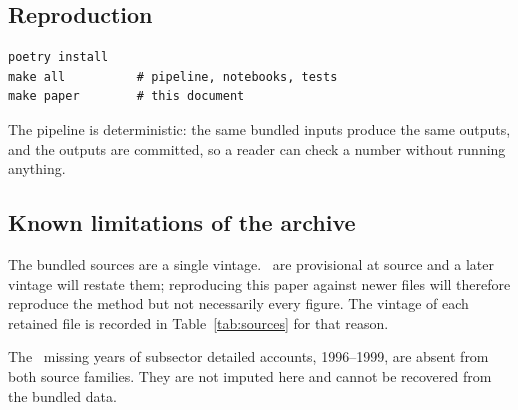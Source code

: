 \subsection{Reproduction}

\begin{verbatim}
poetry install
make all          # pipeline, notebooks, tests
make paper        # this document
\end{verbatim}

The pipeline is deterministic: the same bundled inputs produce the same outputs, and
the outputs are committed, so a reader can check a number without running anything.

\subsection{Known limitations of the archive}

The bundled sources are a single vintage. \ProvisionalYears\ are provisional at
source and a later vintage will restate them; reproducing this paper against newer
files will therefore reproduce the method but not necessarily every figure. The
vintage of each retained file is recorded in Table~\ref{tab:sources} for that reason.

The \GapYears\ missing years of subsector detailed accounts, 1996--1999, are absent
from both source families. They are not imputed here and cannot be recovered from the
bundled data.
